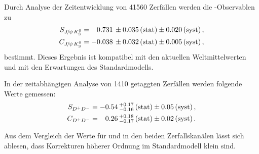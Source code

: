 Durch Analyse der Zeitentwicklung von \num{41560} \BdToJPsiKS Zerfällen werden
die \CP-Observablen zu
\begin{align*}
  S_{{{J\mskip -3mu/\mskip -2mu\psi\mskip 2mu}}{{K}^0_{\mathrm{ \scriptscriptstyle S}}}} &=  \phantom{-}0.731 \, \pm 0.035 \, \text{(stat)} \pm 0.020 \, \text{(syst)}\,, \\
  C_{{{J\mskip -3mu/\mskip -2mu\psi\mskip 2mu}}{{K}^0_{\mathrm{ \scriptscriptstyle S}}}} &=  			- 0.038 \, \pm 0.032 \, \text{(stat)} \pm 0.005 \, \text{(syst)}\,,
\end{align*}
bestimmt. Dieses Ergebnis ist kompatibel mit den aktuellen Weltmittelwerten
und mit den Erwartungen des Standardmodells.

In der zeitabhängigen Analyse von \num{1410} getaggten \BdToDD Zerfällen werden folgende Werte gemessen:
\begin{align*}
  S_{{{D}^+}{{D}^-}} &=  -0.54 \, ^{+0.17}_{-0.16} \, \text{(stat)} \pm 0.05 \, \text{(syst)}\,, \\
  C_{{{D}^+}{{D}^-}} &=  \phantom{-}0.26 \, ^{+0.18}_{-0.17} \, \text{(stat)} \pm 0.02 \, \text{(syst)}\,.
\end{align*}

Aus dem Vergleich der Werte für \Sf und \Cf in den beiden Zerfallskanälen
lässt sich ablesen, dass Korrekturen höherer Ordnung im Standardmodell klein
sind.
